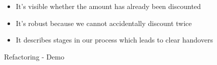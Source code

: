 \begin{frame}[fragile]{\de{}}

\begin{itemize}
\item It's visible whether the amount has already been discounted
\item It's robust because we cannot accidentally discount twice
\item It describes stages in our process which leads to clear handovers
\end{itemize}


\end{frame}


\begin{frame}[fragile]{\de{}}



\end{frame}

\begin{frame}[fragile]{\de{}}



\end{frame}

\begin{frame}[fragile]{\de{}}



\end{frame}

\begin{frame}[fragile]{\de{}\en{}}

\begin{center}
{
\huge
Refactoring - Demo
}
\end{center}

\end{frame}



